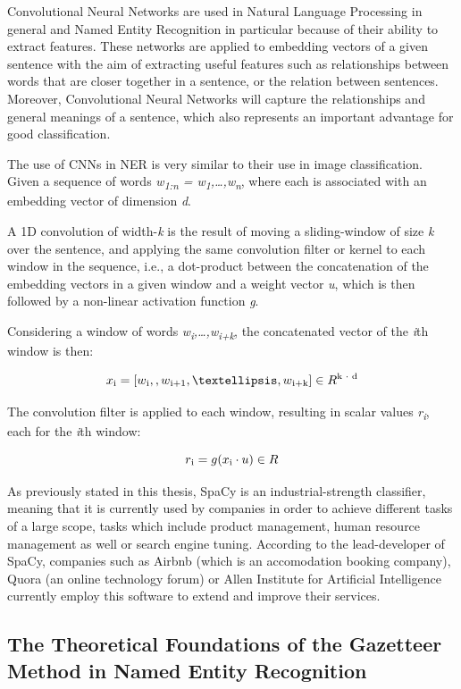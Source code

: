 \documentclass[12pt,a4paper]{article}
\begin{document}
\qquad Convolutional Neural Networks are used in Natural Language Processing in general and Named Entity Recognition in particular because of their ability to extract features. These networks are applied to embedding vectors of a given sentence with the aim of extracting useful features such as relationships between words that are closer together in a sentence, or the relation between sentences. Moreover, Convolutional Neural Networks will capture the relationships and general meanings of a sentence, which also represents an important advantage for good classification.

\qquad The use of CNNs in NER is very similar to their use in image classification. Given a sequence of words \textit{w\textsubscript{1:n} = \textit{w\textsubscript{1},…,w\textsubscript{n}}}, where each is associated with an embedding vector of dimension \textit{d}.

\qquad A 1D convolution of width-\textit{k} is the result of moving a sliding-window of size \textit{k} over the sentence, and applying the same convolution filter or kernel to each window in the sequence, i.e., a dot-product between the concatenation of the embedding vectors in a given window and a weight vector \textit{u}, which is then followed by a non-linear activation function \textit{g}.

\qquad Considering a window of words \textit{w\textsubscript{i},…,w\textsubscript{i+k}}, the concatenated vector of the \textit{i}th window is then:

\[x\textsubscript{i} = [w\textsubscript{i}, ,w\textsubscript{i+1},…,w\textsubscript{i+k}] \in R\textsuperscript{k $\cdot$ d}\]

The convolution filter is applied to each window, resulting in scalar values \textit{r\textsubscript{i}}, each for the \textit{i}th window:

\[r\textsubscript{i} = g(x\textsubscript{i} \cdot u) \in R\]

As previously stated in this thesis, SpaCy is an industrial-strength classifier, meaning that it is currently used by companies in order to achieve different tasks of a large scope, tasks which include product management, human resource management as well or search engine tuning. According to the lead-developer of SpaCy, companies such as Airbnb (which is an accomodation booking company), Quora (an online technology forum) or Allen Institute for Artificial Intelligence currently employ this software to extend and improve their services. 

\subsection{The Theoretical Foundations of the Gazetteer Method in Named Entity Recognition}
\end{document}

